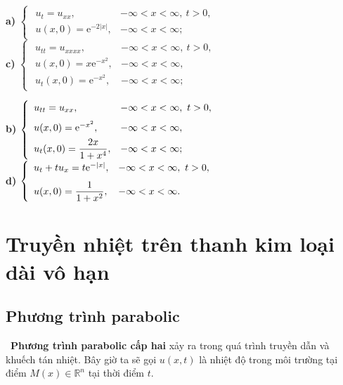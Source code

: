 \documentclass[10pt, a4paper]{article}
\begin{document}
	\begin{multicols}{2}
		\begin{flushleft}
			\textbf{a) }$\begin{cases}
			\begin{array}{ll}
				u_t=u_{xx}, & -\infty<x<\infty,~t>0,\\
				u(x,0)=\mathrm e^{-2|x|}, & -\infty<x<\infty;
			\end{array}
			\end{cases}$\\\vspace{18mm}
			\textbf{c) }$\begin{cases}
				\begin{array}{ll}
					u_{tt}=u_{xxxx}, & -\infty<x<\infty,~t>0,\\
					u(x,0)=x\mathrm e^{-x^2}, & -\infty<x<\infty,\\
					u_t(x,0)=\mathrm e^{-x^2}, & -\infty<x<\infty;
				\end{array}
			\end{cases}$
		\end{flushleft}
		\columnbreak
		\begin{flushleft}
			\textbf{b) }$\begin{cases}
			\begin{array}{ll}
				u_{tt}=u_{xx}, & -\infty<x<\infty,~t>0,\\
				\noalign{\vskip6pt}
				u(x,0)=\mathrm e^{-x^2}, & -\infty<x<\infty,\\
				\noalign{\vskip4pt}
				u_t(x,0)=\dfrac{2x}{1+x^4}, & -\infty<x<\infty;
				\end{array}
			\end{cases}$\\\vspace{9mm}
			\textbf{d) }$\begin{cases}
				\begin{array}{ll}
					u_{t}+tu_{x}=t\mathrm e^{-|x|}, & -\infty<x<\infty,~t>0,\\
					\noalign{\vskip7pt}
					u(x,0)=\dfrac{1}{1+x^2}, & -\infty<x<\infty.
				\end{array}
			\end{cases}$
		\end{flushleft}
	\end{multicols}
	\newpage
	\section{Truyền nhiệt trên thanh kim loại dài vô hạn}
	\subsection{Phương trình parabolic}
	\vspace{2mm}
	\quad\,\,\,\textbf{\color{red}Phương trình parabolic cấp hai} xảy ra trong quá trình truyền dẫn và khuếch tán nhiệt. Bây giờ ta sẽ gọi $u(x,t)$ là nhiệt độ trong môi trường tại điểm $M(x)\in\mathbb R^n$ tại thời điểm $t$.\\
	
\end{document}
